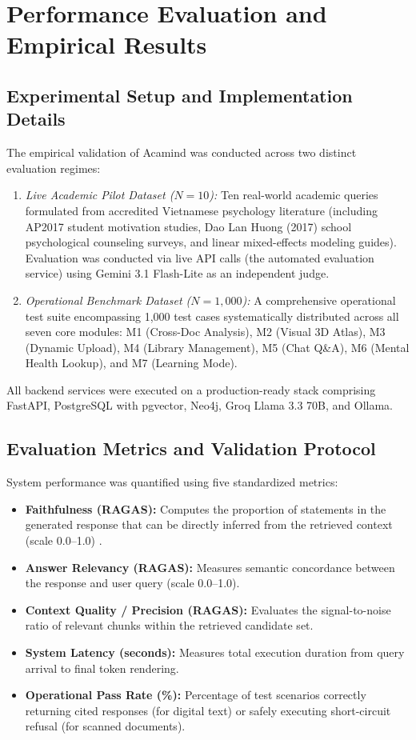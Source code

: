 \documentclass[10pt]{SPIIRAS_Proceedings}
\begin{document}
\section{Performance Evaluation and Empirical Results}\label{sec:experiments}

\subsection{Experimental Setup and Implementation Details}
The empirical validation of Acamind was conducted across two distinct evaluation regimes:
\begin{enumerate}
    \item \textit{Live Academic Pilot Dataset ($N=10$):} Ten real-world academic queries formulated from accredited Vietnamese psychology literature (including AP2017 student motivation studies, Dao Lan Huong (2017) school psychological counseling surveys, and linear mixed-effects modeling guides). Evaluation was conducted via live API calls (the automated evaluation service) using Gemini 3.1 Flash-Lite as an independent judge.
    \item \textit{Operational Benchmark Dataset ($N=1,000$):} A comprehensive operational test suite encompassing 1,000 test cases systematically distributed across all seven core modules: M1 (Cross-Doc Analysis), M2 (Visual 3D Atlas), M3 (Dynamic Upload), M4 (Library Management), M5 (Chat Q\&A), M6 (Mental Health Lookup), and M7 (Learning Mode).
\end{enumerate}

All backend services were executed on a production-ready stack comprising FastAPI, PostgreSQL with pgvector, Neo4j, Groq Llama 3.3 70B, and Ollama.

\subsection{Evaluation Metrics and Validation Protocol}
System performance was quantified using five standardized metrics:
\begin{itemize}
    \item \textbf{Faithfulness (RAGAS):} Computes the proportion of statements in the generated response that can be directly inferred from the retrieved context (scale 0.0--1.0) \cite{min2023factscore}.
    \item \textbf{Answer Relevancy (RAGAS):} Measures semantic concordance between the response and user query (scale 0.0--1.0).
    \item \textbf{Context Quality / Precision (RAGAS):} Evaluates the signal-to-noise ratio of relevant chunks within the retrieved candidate set.
    \item \textbf{System Latency (seconds):} Measures total execution duration from query arrival to final token rendering.
    \item \textbf{Operational Pass Rate (\%):} Percentage of test scenarios correctly returning cited responses (for digital text) or safely executing short-circuit refusal (for scanned documents).
\end{itemize}
\end{document}
